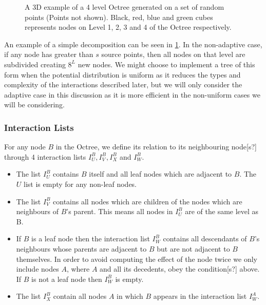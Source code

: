\begin{figure}[ht]
    \centering
    \resizebox{.6\linewidth}{!}{}
    \caption{A 3D example of a 4 level Octree generated on a set of random points (Points not shown). Black, red, blue and green cubes represents nodes on Level 1, 2, 3 and 4 of the Octree respectively.}
    \label{fig:Decompostionexample}
\end{figure}

An example of a simple decomposition can be seen in \cref{fig:Decompostionexample}. In the non-adaptive case, if any node has greater than $s$ source points, then all nodes on that level are subdivided creating $8^L$ new nodes. We might choose to implement a tree of this form when the potential distribution is uniform as it reduces the types and complexity of the interactions described later, but we will only consider the adaptive case in this discussion as it is more efficient in the non-uniform cases we will be considering.

\subsubsection{Interaction Lists}
For any node $B$ in the Octree, we define its relation to its neighbouring node[s?] through 4 interaction lists $I_U^B, I_V^B, I_X^B$ and $I_W^B$.

\begin{itemize}
\item The list $I^B_U$ contains $B$ itself and all leaf nodes which are adjacent to $B$. The $U$ list is empty for any non-leaf nodes.

\item The list $I_V^B$ contains all nodes which are children of the nodes which are neighbours of $B$'s parent. This means all nodes in $I_U^B$ are of the same level as B.

\item If $B$ is a leaf node then the interaction list $I_W^B$ contains all descendants of $B$'s neighbours whose parents are adjacent to $B$ but are not adjacent to $B$ themselves. In order to avoid computing the effect of the node twice we only include nodes $A$, where $A$ and all its decedents, obey the condition[s?] above. If $B$ is not a leaf node then $I_W^B$ is empty.

\item The list $I_X^B$ contain all nodes $A$ in which $B$ appears in the interaction list $I_W^A$.
\end{itemize}

